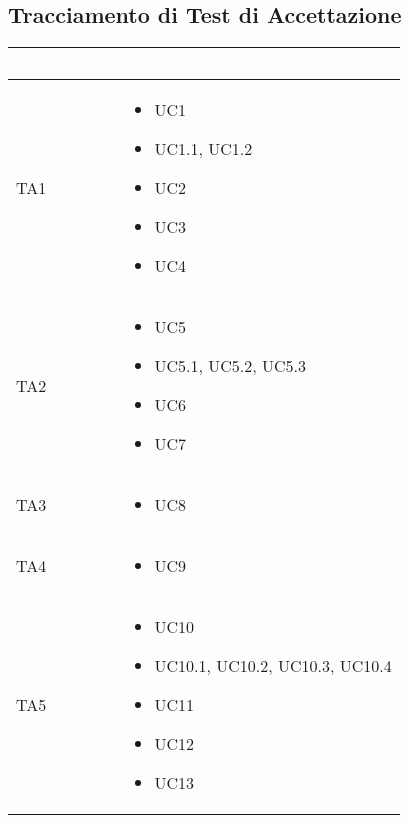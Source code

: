 \newpage

\subsection{Tracciamento di Test di Accettazione}

{
    \setlength{\freewidth}{\dimexpr\textwidth-10\tabcolsep}
    \renewcommand{\arraystretch}{1.5}
    \centering
    \setlength{\aboverulesep}{0pt}
    \setlength{\belowrulesep}{0pt}
    \begin{longtable}{C{.3\freewidth} C{.3\freewidth}}
       \toprule
    \textcolor{white}{\textbf{Codice Test}}&
    \textcolor{white}{\textbf{Codice caso d'uso}}\\
    \toprule
    \endhead

    TA1 & \begin{itemize}
        \item UC1
        \item UC1.1, UC1.2
        \item UC2
        \item UC3
        \item UC4
    \end{itemize} \\

    
    TA2 & \begin{itemize}
        \item UC5
        \item UC5.1, UC5.2, UC5.3
        \item UC6
        \item UC7
    \end{itemize} \\

    
    TA3 & \begin{itemize}
        \item UC8
    \end{itemize} \\

    
    TA4 & \begin{itemize}
        \item UC9
    \end{itemize} \\

    
    TA5 & \begin{itemize}
        \item UC10
        \item UC10.1, UC10.2, UC10.3, UC10.4
        \item UC11
        \item UC12
        \item UC13
    \end{itemize} \\


\end{longtable}}
